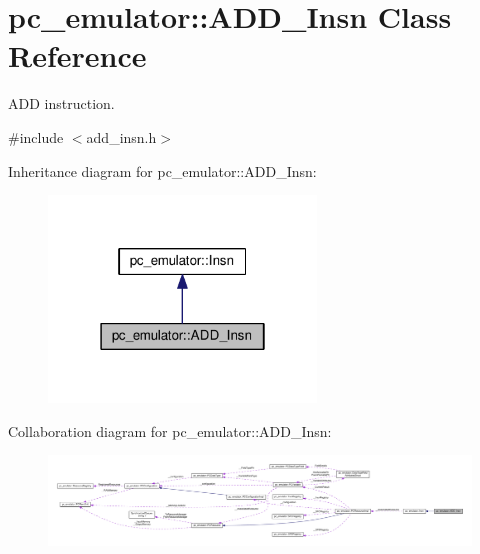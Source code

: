 \hypertarget{classpc__emulator_1_1ADD__Insn}{}\section{pc\+\_\+emulator\+:\+:A\+D\+D\+\_\+\+Insn Class Reference}
\label{classpc__emulator_1_1ADD__Insn}


A\+DD instruction.  




{\ttfamily \#include $<$add\+\_\+insn.\+h$>$}



Inheritance diagram for pc\+\_\+emulator\+:\+:A\+D\+D\+\_\+\+Insn\+:\nopagebreak
\begin{figure}[H]
\begin{center}
\leavevmode
\includegraphics[width=202pt]{classpc__emulator_1_1ADD__Insn__inherit__graph}
\end{center}
\end{figure}


Collaboration diagram for pc\+\_\+emulator\+:\+:A\+D\+D\+\_\+\+Insn\+:\nopagebreak
\begin{figure}[H]
\begin{center}
\leavevmode
\includegraphics[width=350pt]{classpc__emulator_1_1ADD__Insn__coll__graph}
\end{center}
\end{figure}
